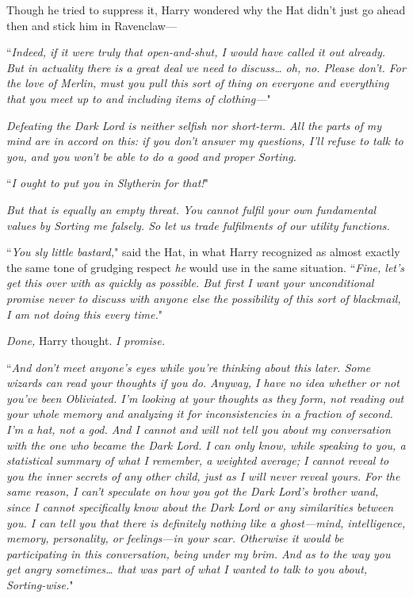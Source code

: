 Though he tried to suppress it, Harry wondered why the Hat didn't just go ahead then and stick him in Ravenclaw—

``\emph{Indeed, if it were truly that open-and-shut, I would have called it out already. But in actuality there is a great deal we need to discuss{\ldots} oh, no. Please don't. For the love of Merlin, \emph{must} you pull this sort of thing on everyone and everything that you meet up to and including items of clothing—}"

\emph{Defeating the Dark Lord is neither selfish nor short-term. All the parts of my mind are in accord on this: if you don't answer my questions, I'll refuse to talk to you, and you won't be able to do a good and proper Sorting.}

``\emph{I ought to put you in Slytherin for that!}"

\emph{But that is \emph{equally} an empty threat. You cannot fulfil your own fundamental values by Sorting me falsely. So let us trade fulfilments of our utility functions.}

``\emph{You sly little bastard,}" said the Hat, in what Harry recognized as almost exactly the same tone of grudging respect \emph{he} would use in the same situation. ``\emph{Fine, let's get this over with as quickly as possible. But first I want your unconditional promise never to discuss with anyone else the possibility of this sort of blackmail, I am \emph{not} doing this every time.}"

\emph{Done,} Harry thought. \emph{I promise.}

``\emph{And don't meet anyone's eyes while you're thinking about this later. Some wizards can read your thoughts if you do. Anyway, I have no idea whether or not you've been Obliviated. I'm looking at your thoughts as they form, not reading out your whole memory and analyzing it for inconsistencies in a fraction of second. I'm a hat, not a god. And I cannot and will not tell you about my conversation with the one who became the Dark Lord. I can only \emph{know}, while speaking to you, a statistical summary of what I remember, a weighted average; I \emph{cannot} reveal to you the inner secrets of any other child, just as I will never reveal yours. For the same reason, I can't speculate on how you got the Dark Lord's brother wand, since I cannot specifically know about the Dark Lord or any similarities between you. I \emph{can} tell you that there is definitely nothing like a ghost—mind, intelligence, memory, personality, or feelings—in your scar. Otherwise it would be participating in this conversation, being under my brim. And as to the way you get angry sometimes{\ldots} that was part of what I wanted to talk to you about, Sorting-wise.}"

